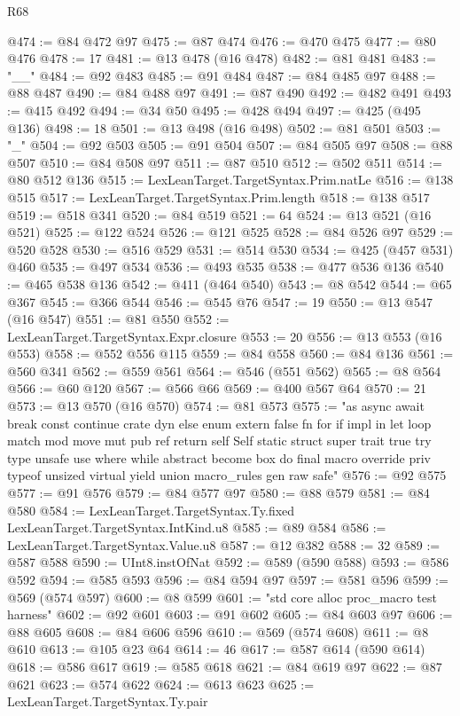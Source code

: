 \begin{lexlean}{R68}
\begin{coremodule}
@474 := @84 @472 @97
@475 := @87 @474
@476 := @470 @475
@477 := @80 @476
@478 := 17
@481 := @13 @478 (@16 @478)
@482 := @81 @481
@483 := "__"
@484 := @92 @483
@485 := @91 @484
@487 := @84 @485 @97
@488 := @88 @487
@490 := @84 @488 @97
@491 := @87 @490
@492 := @482 @491
@493 := @415 @492
@494 := @34 @50
@495 := @428 @494
@497 := @425 (@495 @136)
@498 := 18
@501 := @13 @498 (@16 @498)
@502 := @81 @501
@503 := "_"
@504 := @92 @503
@505 := @91 @504
@507 := @84 @505 @97
@508 := @88 @507
@510 := @84 @508 @97
@511 := @87 @510
@512 := @502 @511
@514 := @80 @512 @136
@515 := LexLeanTarget.TargetSyntax.Prim.natLe
@516 := @138 @515
@517 := LexLeanTarget.TargetSyntax.Prim.length
@518 := @138 @517
@519 := @518 @341
@520 := @84 @519
@521 := 64
@524 := @13 @521 (@16 @521)
@525 := @122 @524
@526 := @121 @525
@528 := @84 @526 @97
@529 := @520 @528
@530 := @516 @529
@531 := @514 @530
@534 := @425 (@457 @531) @460
@535 := @497 @534
@536 := @493 @535
@538 := @477 @536 @136
@540 := @465 @538 @136
@542 := @411 (@464 @540)
@543 := @8 @542
@544 := @65 @367
@545 := @366 @544
@546 := @545 @76
@547 := 19
@550 := @13 @547 (@16 @547)
@551 := @81 @550
@552 := LexLeanTarget.TargetSyntax.Expr.closure
@553 := 20
@556 := @13 @553 (@16 @553)
@558 := @552 @556 @115
@559 := @84 @558
@560 := @84 @136
@561 := @560 @341
@562 := @559 @561
@564 := @546 (@551 @562)
@565 := @8 @564
@566 := @60 @120
@567 := @566 @66
@569 := @400 @567 @64
@570 := 21
@573 := @13 @570 (@16 @570)
@574 := @81 @573
@575 := "as async await break const continue crate dyn else enum extern false fn for if impl in let loop match mod move mut pub ref return self Self static struct super trait true try type unsafe use where while abstract become box do final macro override priv typeof unsized virtual yield union macro_rules gen raw safe"
@576 := @92 @575
@577 := @91 @576
@579 := @84 @577 @97
@580 := @88 @579
@581 := @84 @580
@584 := LexLeanTarget.TargetSyntax.Ty.fixed LexLeanTarget.TargetSyntax.IntKind.u8
@585 := @89 @584
@586 := LexLeanTarget.TargetSyntax.Value.u8
@587 := @12 @382
@588 := 32
@589 := @587 @588
@590 := UInt8.instOfNat
@592 := @589 (@590 @588)
@593 := @586 @592
@594 := @585 @593
@596 := @84 @594 @97
@597 := @581 @596
@599 := @569 (@574 @597)
@600 := @8 @599
@601 := "std core alloc proc_macro test harness"
@602 := @92 @601
@603 := @91 @602
@605 := @84 @603 @97
@606 := @88 @605
@608 := @84 @606 @596
@610 := @569 (@574 @608)
@611 := @8 @610
@613 := @105 @23 @64
@614 := 46
@617 := @587 @614 (@590 @614)
@618 := @586 @617
@619 := @585 @618
@621 := @84 @619 @97
@622 := @87 @621
@623 := @574 @622
@624 := @613 @623
@625 := LexLeanTarget.TargetSyntax.Ty.pair

\end{coremodule}
\end{lexlean}
